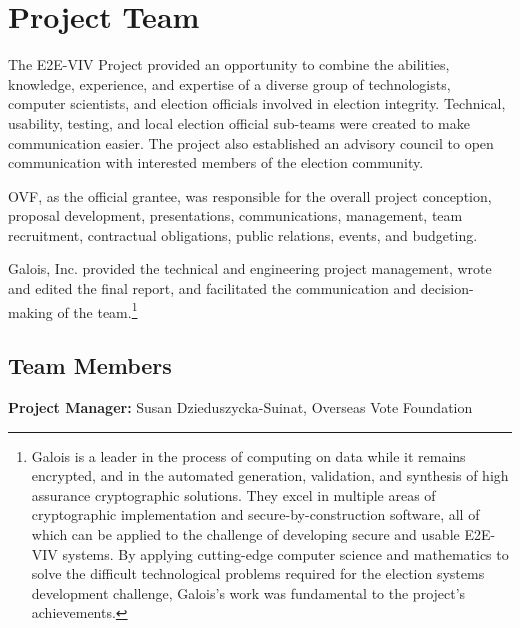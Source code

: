 \section{Project Team}
\label{sec:people}

The E2E-VIV Project provided an opportunity to combine the abilities,
knowledge, experience, and expertise of a diverse group of
technologists, computer scientists, and election officials involved in
election integrity. Technical, usability, testing, and local election
official sub-teams were created to make communication easier. The
project also established an advisory council to open communication
with interested members of the election community.

OVF, as the official grantee, was responsible for the overall project
conception, proposal development, presentations, communications,
management, team recruitment, contractual obligations, public
relations, events, and budgeting. 

Galois, Inc. provided the technical and engineering project
management, wrote and edited the final report, and facilitated the communication and decision-making
of the team.\footnote{Galois is a leader in the process of computing
  on data while it remains encrypted, and in the automated generation,
  validation, and synthesis of high assurance cryptographic
  solutions. They excel in multiple areas of cryptographic
  implementation and secure-by-construction software, all of which can
  be applied to the challenge of developing secure and usable E2E-VIV
  systems. By applying cutting-edge computer science and mathematics
  to solve the difficult technological problems required for the
  election systems development challenge, Galois’s work was
  fundamental to the project’s achievements.}

\subsection{Team Members}
\label{sec:team-members}

\textbf{Project Manager:} Susan Dzieduszycka-Suinat, Overseas Vote Foundation

